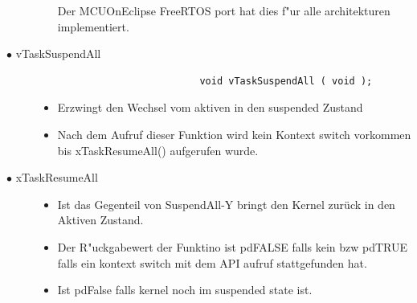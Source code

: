 \documentclass[a4paper, 8pt]{extarticle}
\begin{document}
\begin{multicols*}{3}
\begin{description}
\begin{itemize}
								  Der MCUOnEclipse FreeRTOS port hat dies f"ur alle architekturen implementiert.
						\end{itemize} 	
					\item[$\bullet$ vTaskSuspendAll]
						\begin{lstlisting}
							void vTaskSuspendAll ( void );
						\end{lstlisting}  
						\begin{itemize}
							\item Erzwingt den Wechsel vom aktiven in den suspended Zustand
							\item Nach dem Aufruf dieser Funktion wird kein Kontext switch vorkommen bis xTaskResumeAll() aufgerufen wurde.					
						\end{itemize} 
						\item[$\bullet$ xTaskResumeAll]
						\begin{itemize}
							\item Ist das Gegenteil von SuspendAll-Y bringt den Kernel zurück in den Aktiven Zustand.
							\item Der R"uckgabewert der Funktino ist pdFALSE falls kein bzw pdTRUE falls ein kontext switch mit dem API aufruf stattgefunden hat.
							\item Ist pdFalse falls kernel noch im suspended state ist.					
						\end{itemize} 
				\end{description}

\end{multicols*}
\end{document}
